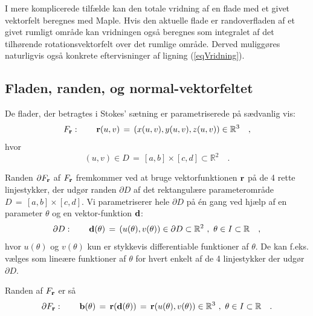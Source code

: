 \begin{aha}
I mere komplicerede tilfælde kan den totale
vridning af en flade med et givet vektorfelt
beregnes med Maple. Hvis den aktuelle
flade er randoverfladen af et givet rumligt
område kan vridningen også beregnes som integralet af det tilhørende  rotationsvektorfelt over det rumlige område. Derved muliggøres
naturligvis også konkrete eftervisninger af
ligning (\ref{eqVridning}).
\end{aha}




\subsection{Fladen, randen, og normal-vektorfeltet} \label{secSurf}
De flader, der betragtes i Stokes' sætning er
parametriserede på sædvanlig vis:
\begin{equation}
F_{\bf{r}}: \qquad  {\bf{r}}(u,v) \, = \,
(x(u,v), y(u,v), z(u,v)) \in \mathbb{R}^{3} \quad ,
\end{equation}
hvor
\begin{equation}
(u,v) \in D\, = \, [a, b]\times[c, d]
\subset \mathbb{R}^{2} \quad.
\end{equation}

Randen $\partial F_{\bf{r}}$ af $F_{\bf{r}}$
fremkommer ved at bruge vektorfunktionen $\bf{r}$
på de 4 rette linjestykker, der udgør randen
$\partial D$ af det rektangulære parameterområde
$D\, = \, [a, b]\times[c, d]$. Vi parametriserer
hele $\partial D$ på \'{e}n gang ved hjælp af en
parameter $\theta$ og en vektor-funktion
$\bf{d}$:
$$
\partial D: \qquad  {\bf{d}}(\theta) \, = \, (u(\theta), v(\theta)) \in
\partial D \subset \mathbb{R}^{2} \,\, , \,\, \theta \in I \subset \mathbb{R} \quad,
$$
hvor $u(\theta)$ og $v(\theta)$ kun er stykkevis
differentiable funktioner af $\theta$. De kan
f.eks. vælges som lineære funktioner af $\theta$
for hvert enkelt  af de 4 linjestykker der udgør
$\partial D$.

Randen af $F_{\bf{r}}$ er så
$$
\partial F_{\bf{r}}: \qquad  {\bf{b}}(\theta)\,
= \,{\bf{r}}({\bf{d}}(\theta)) \, = \,
{\bf{r}}(u(\theta), v(\theta)) \in
\mathbb{R}^{3}\,\, , \,\, \theta \in I \subset
\mathbb{R} \quad.
$$

